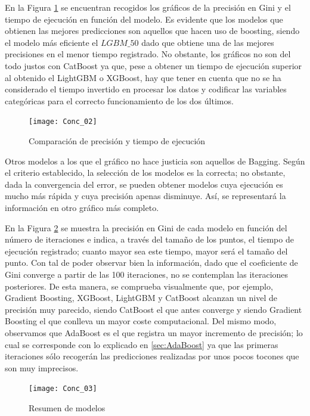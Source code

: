 \documentclass[12pt,twoside]{article}
\begin{document}
En la Figura \ref{fig:Model_comparison_01} se encuentran recogidos los gráficos de la precisión en Gini y el tiempo de ejecución en función del modelo. Es evidente que los modelos que obtienen las mejores predicciones son aquellos que hacen uso de boosting, siendo el modelo más eficiente el $LGBM\_50$ dado que obtiene una de las mejores precisiones en el menor tiempo registrado. No obstante, los gráficos no son del todo justos con CatBoost ya que, pese a obtener un tiempo de ejecución superior al obtenido el LightGBM o XGBoost, hay que tener en cuenta que no se ha considerado el tiempo invertido en procesar los datos y codificar las variables categóricas para el correcto funcionamiento de los dos últimos.

\begin{figure}[H]
\centering
\texttt{[image: Conc\_02]}
\caption{Comparación de precisión y tiempo de ejecución}
\label{fig:Model_comparison_01}
\end{figure}

Otros modelos a los que el gráfico no hace justicia son aquellos de Bagging. Según el criterio establecido, la selección de los modelos es la correcta; no obstante, dada la convergencia del error, se pueden obtener modelos cuya ejecución es mucho más rápida y cuya precisión apenas disminuye. Así, se representará la información en otro gráfico más completo.

En la Figura \ref{fig:Model_comparison_02} se muestra la precisión en Gini de cada modelo en función del número de iteraciones e indica, a través del tamaño de los puntos, el tiempo de ejecución registrado; cuanto mayor sea este tiempo, mayor será el tamaño del punto. Con tal de poder observar bien la información, dado que el coeficiente de Gini converge a partir de las 100 iteraciones, no se contemplan las iteraciones posteriores. De esta manera, se comprueba visualmente que, por ejemplo, Gradient Boosting, XGBoost, LightGBM y CatBoost alcanzan un nivel de precisión muy parecido, siendo CatBoost el que antes converge y siendo Gradient Boosting el que conlleva un mayor coste computacional. Del mismo modo, observamos que AdaBoost es el que registra un mayor incremento de precisión; lo cual se corresponde con lo explicado en \ref{sec:AdaBoost} ya que las primeras iteraciones sólo recogerán las predicciones realizadas por unos pocos tocones que son muy imprecisos.
\begin{figure}[h]
\centering
\texttt{[image: Conc\_03]}
\caption{Resumen de modelos}
\label{fig:Model_comparison_02}
\end{figure}
\end{document}
